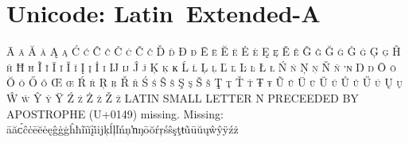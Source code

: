 

\presection\section*{\checkno Unicode: Latin~Extended-A}\postsection

\textsc{Ā ā Ă ă Ą ą Ć ć Ĉ ĉ Ċ ċ Č č Ď ď Đ đ Ē ē Ĕ ĕ Ė ė Ę ę 
Ě ě Ĝ ĝ Ğ ğ Ġ ġ Ģ ģ Ĥ ĥ Ħ ħ Ĩ ĩ Ī ī Ĭ ĭ Į į İ ı Ĳ ĳ Ĵ ĵ Ķ ķ 
ĸ Ĺ ĺ Ļ ļ Ľ ľ Ŀ ŀ Ł ł Ń ń Ņ ņ Ň ň ŉ Ŋ ŋ Ō ō Ŏ ŏ Ő ő Œ œ Ŕ ŕ 
Ŗ ŗ Ř ř Ś ś Ŝ ŝ Ş ş Š š Ţ ţ Ť ť Ŧ ŧ Ũ ũ Ū ū Ŭ ŭ Ů ů Ű ű Ų ų 
Ŵ ŵ Ŷ ŷ Ÿ Ź ź Ż ż Ž ž} LATIN SMALL LETTER N PRECEEDED BY APOSTROPHE (U+0149) missing.
\hfill Missing: āăᴄ́ĉċēĕėęĝġģĥħĩīĭįi̇ijķĺļľńņŉŋōŏŕŗśŝşţŧũūŭųŵŷÿźż